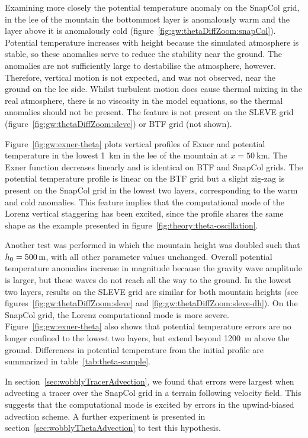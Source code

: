 Examining more closely the potential temperature anomaly on the SnapCol grid, in the lee of the mountain the bottommost layer is anomalously warm and the layer above it is anomalously cold (figure~\ref{fig:gw:thetaDiffZoom:snapCol}).  Potential temperature increases with height because the simulated atmosphere is stable, so these anomalies serve to reduce the stability near the ground.  The anomalies are not sufficiently large to destabilise the atmosphere, however.   Therefore, vertical motion is not expected, and was not observed, near the ground on the lee side.   Whilst turbulent motion does cause thermal mixing in the real atmosphere, there is no viscosity in the model equations, so the thermal anomalies should not be present.  The feature is not present on the SLEVE grid (figure~\ref{fig:gw:thetaDiffZoom:sleve}) or BTF grid (not shown).

Figure~\ref{fig:gw:exner-theta} plots vertical profiles of Exner and potential temperature in the lowest \SI{1}{\kilo\meter} in the lee of the mountain at $x = \SI{50}{\kilo\meter}$.  The Exner function decreases linearly and is identical on BTF and SnapCol grids.  The potential temperature profile is linear on the BTF grid but a slight zig-zag is present on the SnapCol grid in the lowest two layers, corresponding to the warm and cold anomalies.
This feature implies that the computational mode of the Lorenz vertical staggering has been excited, since the profile shares the same shape as the example presented in figure~\ref{fig:theory:theta-oscillation}.

Another test was performed in which the mountain height was doubled such that $h_0 = \SI{500}{\meter}$, with all other parameter values unchanged.  Overall potential temperature anomalies increase in magnitude because the gravity wave amplitude is larger, but these waves do not reach all the way to the ground.  In the lowest two layers, results on the SLEVE grid are similar for both mountain heights (see figures~\ref{fig:gw:thetaDiffZoom:sleve} and \ref{fig:gw:thetaDiffZoom:sleve-dh}).  On the SnapCol grid, the Lorenz computational mode is more severe.  Figure~\ref{fig:gw:exner-theta} also shows that potential temperature errors are no longer confined to the lowest two layers, but extend beyond \SI{1200}{\meter} above the ground.  Differences in potential temperature from the initial profile are summarized in table~\ref{tab:theta-sample}.

In section~\ref{sec:wobblyTracerAdvection}, we found that errors were largest when advecting a tracer over the SnapCol grid in a terrain following velocity field.  This suggests that the computational mode is excited by errors in the upwind-biased advection scheme.  A further experiment is presented in section~\ref{sec:wobblyThetaAdvection} to test this hypothesis.

